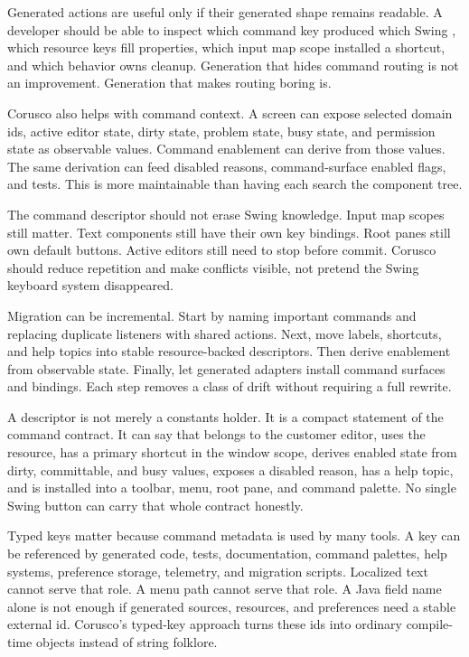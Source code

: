 Generated actions are useful only if their generated shape remains readable. A developer should be able to inspect which command key produced which Swing , which resource keys fill properties, which input map scope installed a shortcut, and which behavior owns cleanup. Generation that hides command routing is not an improvement. Generation that makes routing boring is.

Corusco also helps with command context. A screen can expose selected domain ids, active editor state, dirty state, problem state, busy state, and permission state as observable values. Command enablement can derive from those values. The same derivation can feed disabled reasons, command-surface enabled flags, and tests. This is more maintainable than having each  search the component tree.

The command descriptor should not erase Swing knowledge. Input map scopes still matter. Text components still have their own key bindings. Root panes still own default buttons. Active editors still need to stop before commit. Corusco should reduce repetition and make conflicts visible, not pretend the Swing keyboard system disappeared.

Migration can be incremental. Start by naming important commands and replacing duplicate listeners with shared actions. Next, move labels, shortcuts, and help topics into stable resource-backed descriptors. Then derive enablement from observable state. Finally, let generated adapters install command surfaces and bindings. Each step removes a class of drift without requiring a full rewrite.

A descriptor is not merely a constants holder. It is a compact statement of the
command contract. It can say that  belongs to the customer
editor, uses the  resource, has a primary shortcut in
the window scope, derives enabled state from dirty, committable, and busy
values, exposes a disabled reason, has a help topic, and is installed into a
toolbar, menu, root pane, and command palette. No single Swing button can carry
that whole contract honestly.

Typed keys matter because command metadata is used by many tools. A key can be
referenced by generated code, tests, documentation, command palettes, help
systems, preference storage, telemetry, and migration scripts. Localized text
cannot serve that role. A menu path cannot serve that role. A Java field name
alone is not enough if generated sources, resources, and preferences need a
stable external id. Corusco's typed-key approach turns these ids into ordinary
compile-time objects instead of string folklore.

